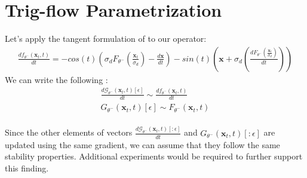 \section{Trig-flow Parametrization} \label{app:trigflow}

Let's apply the tangent formulation of \cite{lu2025simplifyingstabilizingscalingcontinuoustime} to our operator:
\begin{align}
    \frac{d f_{\theta^{-}}(\mathbf{x}_t, t)}{dt} = -cos(t)\left(\sigma_d F_{\theta^{-}}\left(\frac{\mathbf{x}_t}{\sigma_d} \right) - \frac{d\mathbf{x}}{dt}\right) - sin(t) \left(\mathbf{x} + \sigma_d \left(\frac{d F_{\theta^{-}}\left(\frac{\mathbf{x}_t}{\sigma_d} \right)}{dt} \right) \right)
\end{align}
\noindent We can write the following : 
\begin{align}
   \frac{d \mathcal{G}_{\theta^{-}}(\mathbf{x}_t, t)\left[ \epsilon \right]}{dt} \sim\frac{d f_{\theta^{-}}(\mathbf{x}_t, t)}{dt} \\   
    G_{\theta^{-}}(\mathbf{x}_t, t)\left[ \epsilon \right] \sim F_{\theta^{-}}(\mathbf{x}_t, t) \\ 
\end{align}

Since the other elements of vectors $\frac{d \mathcal{G}_{\theta^{-}}(\mathbf{x}_t, t)\left[ :\epsilon \right]}{dt}$ and $G_{\theta^{-}}(\mathbf{x}_t, t)\left[ :\epsilon \right]$ are updated using the same gradient, we can assume that they follow the same stability properties. Additional experiments would be required to further support this finding.
